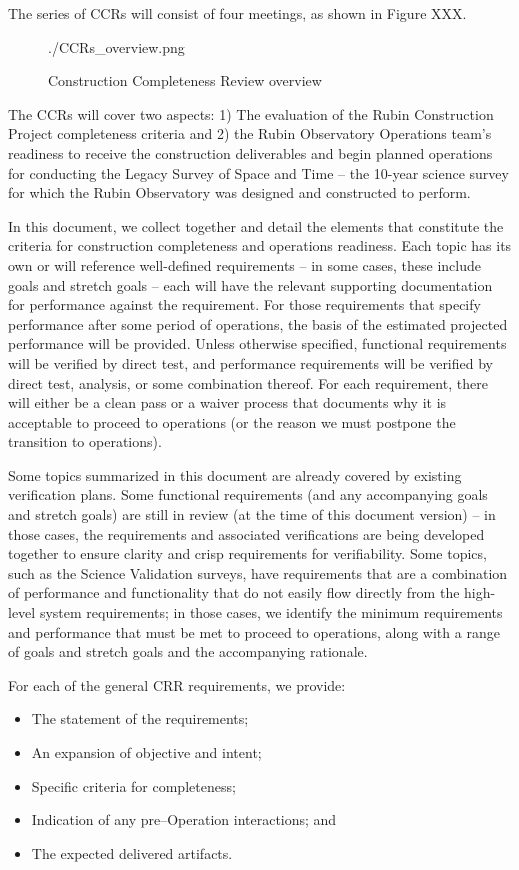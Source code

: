 The series of CCRs will consist of four meetings, as shown in Figure XXX.
\begin{figure}[htbp]
\begin{center}
./CCRs_overview.png
\caption{Construction Completeness Review overview}
\label{CCRs_overview}
\end{center}
\end{figure}


The CCRs will cover two aspects: 
 1) The evaluation of the Rubin Construction Project completeness criteria and 
 2) the Rubin Observatory Operations team's readiness to receive the construction deliverables and begin planned operations for conducting the Legacy Survey of Space and Time -- the 10-year science survey for which the Rubin Observatory was designed and constructed to perform.

In this document, we collect together and detail the elements that constitute the criteria for construction completeness and operations readiness. 
Each topic has its own or will reference well-defined requirements -- in some cases, these include goals and stretch goals -- each will have the relevant supporting documentation for performance against the requirement. For those requirements that specify performance after some period of operations, the basis of the estimated projected performance will be provided. Unless otherwise specified, functional requirements will be verified by direct test, and performance requirements will be verified by direct test, analysis, or some combination thereof.  For each requirement, there will either be a clean pass or a waiver process that documents why it is acceptable to proceed to operations (or the reason we must postpone the transition to operations).

Some topics summarized in this document are already covered by existing verification plans.  Some functional requirements (and any accompanying goals and stretch goals) are still in review (at the time of this document version) -- in those cases, the requirements and associated verifications are being developed together to ensure clarity and crisp requirements for verifiability. Some topics, such as the Science Validation surveys, have requirements that are a combination of performance and functionality that do not easily flow directly from the high-level system requirements; in those cases, we identify the minimum requirements and performance that must be met to proceed to operations, along with a range of goals and stretch goals and the accompanying rationale.

For each of the general CRR requirements, we provide:

\begin{itemize}
	\item The statement of the requirements;
	\item An expansion of objective and intent;
	\item Specific criteria for completeness;
	\item Indication of any pre--Operation interactions; and
	\item The expected delivered artifacts.
\end{itemize}
	